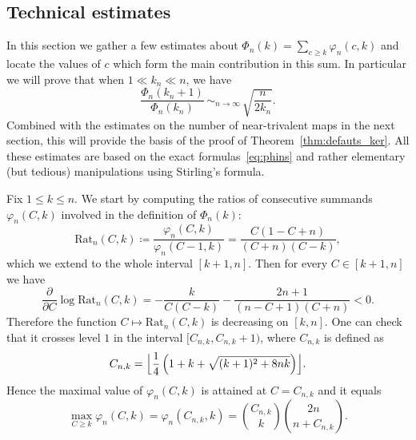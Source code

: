 \documentclass[10pt]{amsart}
\theoremstyle{plain}
\theoremstyle{definition}
\theoremstyle{remark}
\newcommand{\equi}[1][n]{\,\mathop{\sim}^{}_{#1 \to \infty}\,}
\begin{document}
\subsection{Technical estimates}

In this section we gather a few estimates about $\Phi_n(k) = \sum_{c \geq k} \varphi_{n}(c,k)$ and locate the values of $c$ which form the main contribution in this sum. In particular we will prove that when $1 \ll k_{n} \ll n$, we have
\begin{equation}\label{eq:ratioPhi1}
\frac{ \Phi_{n}(k_{n}+1)}{ \Phi_{n}(k_{n})} \equi \sqrt{ \frac{n}{2 k_{n}}}.
\end{equation}
Combined with the estimates on the number of near-trivalent maps in the next section, this will provide the basis of the proof of Theorem~\ref{thm:defauts_ker}. All these estimates are based on the exact formulas~\eqref{eq:phins} and rather elementary (but tedious) manipulations using Stirling's formula.

Fix $1 \leq k \leq n$. We start by computing the ratios of consecutive summands $\varphi_n(C,k)$ involved in the definition of $\Phi_n(k)$:
\begin{equation}\label{eq:def_Rat}
\mathrm{Rat}_{n}(C,k) \coloneqq \frac{\varphi_n(C,k)}{\varphi_n(C-1,k)} = \frac{C (1 - C + n)}{(C + n) (C - k)},
\end{equation}which we extend to the whole interval $[k+1,n]$.
Then for every $C \in [k+1,n]$ we have
\begin{equation}\label{eq:derivlog}
\frac{\partial}{\partial C} \log \mathrm{Rat}_n(C,k)
= - \frac{k}{C(C-k)}- \frac{2n+1}{(n-C+1)(C+n)}
< 0.
\end{equation}
Therefore the function $C \mapsto \mathrm{Rat}_n(C,k)$ is decreasing on $[k,n]$. One can check that it crosses level $1$ in the interval $[C_{n,k},C_{n,k}+1)$, where $C_{n,k}$ is defined as
\begin{equation}\label{eq:argmax_phi}
C_{n,k} = \Bigl\lfloor \frac{1}{4} \left(1+k + \sqrt{ (k+1)^{2} + 8 n k } \right) \Bigr\rfloor.
\end{equation}
Hence the maximal value of $\varphi_n(C,k)$ is attained at $C=C_{n,k}$ and it equals
\[
\max_{C \ge k} \varphi_n(C,k) = \varphi_n(C_{n,k},k) = \binom{C_{n,k}}{k} \binom{2n}{n+C_{n,k}}.
\]
\end{document}
